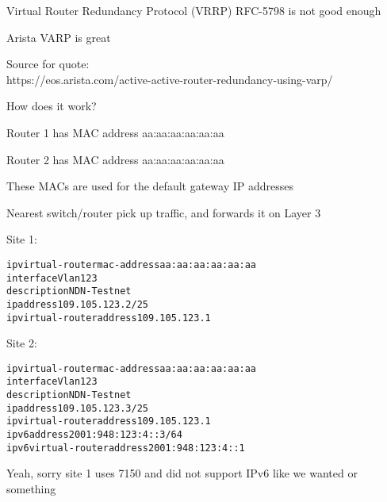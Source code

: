 \documentclass[18pt,landscape,a4paper,footrule]{foils}
\begin{document}




\vskip 1cm
\begin{list2}
\item Virtual Router Redundancy Protocol (VRRP) RFC-5798 is not good enough

\item Arista VARP is great
\end{list2}

Source for quote:\\
https://eos.arista.com/active-active-router-redundancy-using-varp/




How does it work?

\begin{list2}
\item Router 1 has MAC address aa:aa:aa:aa:aa:aa
\item Router 2 has MAC address aa:aa:aa:aa:aa:aa
\item These MACs are used for the default gateway IP addresses
\item Nearest switch/router pick up traffic, and forwards it on Layer 3
\end{list2}



Site 1:
\begin{alltt}\small
ip virtual-router mac-address aa:aa:aa:aa:aa:aa
interface Vlan123
   description NDN-Testnet
   ip address 109.105.123.2/25
   ip virtual-router address 109.105.123.1
\end{alltt}

Site 2:
\begin{alltt}\small
ip virtual-router mac-address aa:aa:aa:aa:aa:aa
interface Vlan123
   description NDN-Testnet
   ip address 109.105.123.3/25
   ip virtual-router address 109.105.123.1
   ipv6 address 2001:948:123:4::3/64
   ipv6 virtual-router address 2001:948:123:4::1
\end{alltt}

\vskip 5mm
\centerline{Yeah, sorry site 1 uses 7150 and did not support IPv6 like we wanted or something \smiley}
\end{document}
